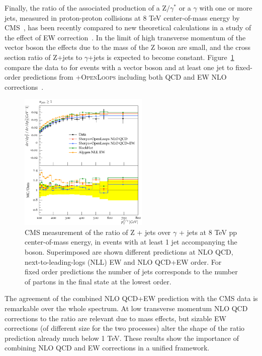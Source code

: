 \documentclass{PoS}
\providecommand{\OPENLOOPS} {{\textsc{OpenLoops}}\xspace}
\begin{document}
Finally, the ratio of the associated production of a $\mathrm{Z}/\gamma^*$ or a $\gamma$ with one or more jets, measured in
proton-proton collisions at 8 TeV center-of-mass energy by CMS~\cite{Khachatryan:2015ira}, has been recently compared to
new theoretical calculations in a study of the effect of EW correction~\cite{Badger:2016bpw}.
In the limit of high transverse momentum of the vector boson the effects due to the mass of the Z
boson are small, and the cross section ratio of Z+jets to $\gamma$+jets is expected to become constant. 
Figure~\ref{zgrNLO} compare the data to for events with a vector boson and at least one
jet to fixed-order predictions from \SHERPA+\OPENLOOPS including both QCD and EW NLO corrections~\cite{Kallweit:2014xda,Kallweit:2015dum}. 
\begin{figure}
\begin{center}
\includegraphics[width=0.55\textwidth]{Figure14.pdf} 
 \caption{CMS measurement of the ratio of Z + jets over $\gamma$ + jets at 8 TeV pp
   center-of-mass energy, in events with at least 1 jet accompanying the
   boson. Superimposed are shown different predictions at NLO QCD, next-to-leading-logs (NLL) EW and NLO QCD+EW order. 
   For fixed order predictions the number of jets corresponds to the
   number of partons in the final state at the lowest order.} 
\label{zgrNLO}
\end{center}
\end{figure}
The agreement of the combined NLO QCD+EW prediction with the CMS data is
remarkable over the whole spectrum. At low transverse momentum
NLO QCD corrections to the ratio are relevant due to mass effects, but sizable
EW corrections (of different size for the two processes) alter the shape of the ratio prediction already much below 1
TeV. These results show the importance of combining NLO QCD and EW corrections in a unified framework.
\end{document}
